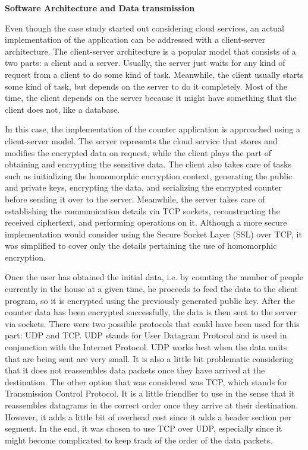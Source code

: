 \textbf{Software Architecture and Data transmission}

Even though the case study started out considering cloud services, an actual implementation of the application can be addressed with a client-server architecture. The client-server architecture is a popular model that consists of a two parts: a client and a server. Usually, the server just waits for any kind of request from a client to do some kind of task. Meanwhile, the client usually starts some kind of task, but depends on the server to do it completely. Most of the time, the client depends on the server because it might have something that the client does not, like a database.

In this case, the implementation of the counter application is approached using a client-server model. The server represents the cloud service that stores and modifies the encrypted data on request, while the client plays the part of obtaining and encrypting the sensitive data. The client also takes care of tasks such as initializing the homomorphic encryption context, generating the public and private keys, encrypting the data, and serializing the encrypted counter before sending it over to the server. Meanwhile, the server takes care of establishing the communication details via TCP sockets, reconstructing the received ciphertext, and performing operations on it. Although a more secure implementation would consider using the Secure Socket Layer (SSL) over TCP, it was simplified to cover only the details pertaining the use of homomorphic encryption.

Once the user has obtained the initial data, i.e. by counting the number of people currently in the house at a given time, he proceeds to feed the data to the client program, so it is encrypted using the previously generated public key. After the counter data has been encrypted successfully, the data is then sent to the server via sockets. There were two possible protocols that could have been used for this part: UDP and TCP. UDP stands for User Datagram Protocol and is used in conjunction with the Internet Protocol. UDP works best when the data units that are being sent are very small. It is also a little bit problematic considering that it does not reassembles data packets once they have arrived at the destination. The other option that was considered was TCP, which stands for Transmission Control Protocol. It is a little friendlier to use in the sense that it reassembles datagrams in the correct order once they arrive at their destination. However, it adds a little bit of overhead cost since it adds a header section per segment. In the end, it was chosen to use TCP over UDP, especially since it might become complicated to keep track of the order of the data packets.

